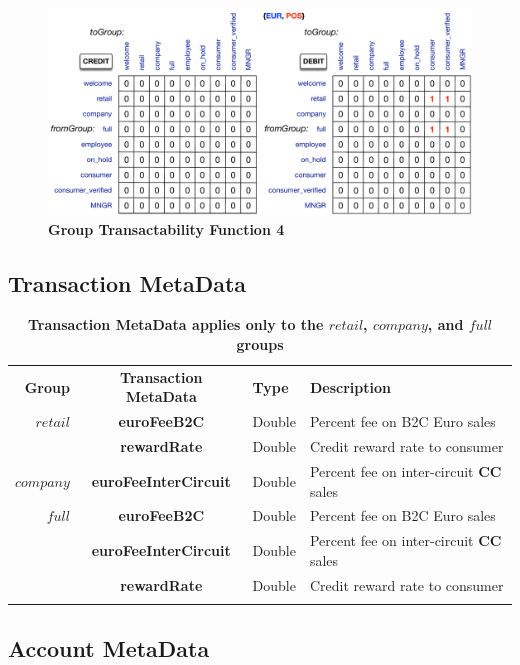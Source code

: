 \begin{figure}[H]
\centering
\includegraphics[width=17cm]{Figures/GTF4}
\caption{\small\textbf{Group Transactability Function 4}}
\label{fig:GTF4}
\end{figure}


\subsection{Transaction MetaData}

\begin{table}[H]
\begin{centering}
\small
{
\begin{tabular}{ r | c | l | l }
\textbf{Group}	& {\bf Transaction MetaData} & {\bf Type} & {\bf Description} \\
\Xhline{1.5pt}
$retail$		& {\bf euroFeeB2C}			&Double	& Percent fee on B2C Euro sales \\
			& {\bf rewardRate}			&Double	& Credit reward rate to consumer \\
\hline
$company$	& {\bf euroFeeInterCircuit}		&Double	& Percent fee on inter-circuit {\bf CC} sales \\
\hline
$full$		& {\bf euroFeeB2C}			&Double	& Percent fee on B2C Euro sales \\
			& {\bf euroFeeInterCircuit}		&Double	& Percent fee on inter-circuit {\bf CC} sales \\
			& {\bf rewardRate}			&Double	& Credit reward rate to consumer \\
\Xhline{1.5pt}
\end{tabular}
}
\caption{\small\textbf{Transaction MetaData applies only to the $retail$, $company$, and $full$ groups}}
\label{tab:TransactionMetaData}
\end{centering}
\end{table}


\subsection{Account MetaData}


